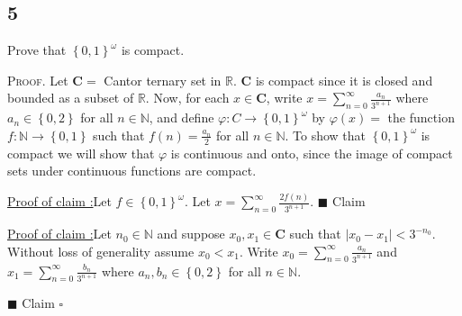 \documentclass[12pt]{article}
\newcounter{ProofCounter}
\newcounter{ClaimCounter}[ProofCounter]
\newenvironment{Proof}{\stepcounter{ProofCounter}\textsc{Proof.}}{\hfill$\square$}
\newenvironment{claim}[1]{\vspace{1mm}\stepcounter{ClaimCounter}\par\noindent\underline{\bf Claim \theClaimCounter:}\space#1}{}
\newenvironment{claimproof}[1]{\par\noindent\underline{Proof of claim \theClaimCounter:}\space#1}{\hfill $\blacksquare$ Claim \theClaimCounter}
\begin{document}
\subsection*{5}
\begin{tcolorbox}
  Prove that $\left\{ 0,1 \right\}^{\omega}$ is compact.
\end{tcolorbox}
\begin{Proof}
  Let $\bm{C} =$ Cantor ternary set in $\mathbb{R}$. $\bm{C}$ is compact since it is closed and bounded as a subset of $\mathbb{R}$. Now, for each $x
  \in \bm{C}$, write $x = \sum_{n=0}^{\infty}\frac{a_n}{3^{n+1}}$ where $a_n \in \left\{ 0,2 \right\}$ for all $n \in \mathbb{N}$, and define
  $\varphi : C \rightarrow \left\{ 0,1 \right\}^{\omega}$ by $\varphi(x) =$ the function $f : \mathbb{N} \rightarrow \left\{ 0,1 \right\}$ such that
  $f(n) = \frac{a_n}{2}$ for all $n \in \mathbb{N}$. To show that $\left\{ 0,1 \right\}^{\omega}$ is compact we will show that $\varphi$ is continuous
  and onto, since the image of compact sets under continuous functions are compact.

  \begin{claimproof}
    Let $f \in \left\{ 0,1 \right\}^{\omega}$. Let $x = \sum_{n=0}^{\infty}\frac{2f(n)}{3^{n+1}}$.
  \end{claimproof}

  \begin{claimproof}
    Let $n_0 \in \mathbb{N}$ and suppose $x_0, x_1 \in \bm{C}$ such that $|x_0 - x_1| < 3^{-n_0}$. Without loss of generality assume $x_0 < x_1$.
    Write $x_0 = \sum_{n=0}^{\infty}\frac{a_n}{3^{n+1}}$ and $x_1 = \sum_{n=0}^{\infty}\frac{b_n}{3^{n+1}}$ where $a_n,b_n \in \left\{ 0,2
    \right\}$ for all $n \in \mathbb{N}$.


\end{claimproof}
\end{Proof}
\end{document}
